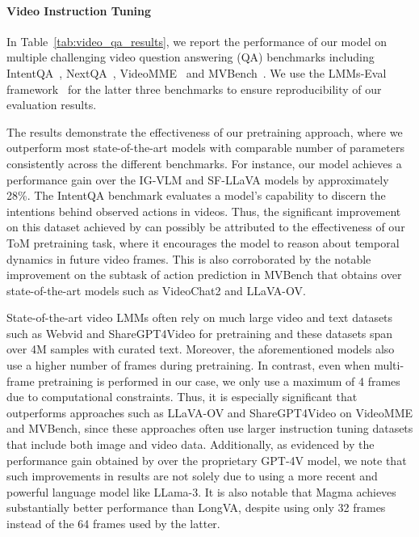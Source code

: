 \vspace{-0.3em}
\paragraph{Video Instruction Tuning} 
In Table~\ref{tab:video_qa_results}, we report the performance of our \magma model on multiple challenging video question answering (QA) benchmarks including IntentQA~\cite{Li2023IntentQACV}, NextQA~\cite{xiao2021next}, VideoMME~\cite{fu2024videommefirstevercomprehensiveevaluation} and MVBench~\cite{li2024mvbenchcomprehensivemultimodalvideo}. We use the LMMs-Eval framework~\cite{lmms_eval2024} for the latter three benchmarks to ensure reproducibility of our evaluation results. 

The results demonstrate the effectiveness of our pretraining approach, where we outperform most state-of-the-art models with comparable number of parameters consistently across the different benchmarks. For instance, our \magma model achieves a performance gain over the IG-VLM and SF-LLaVA models by approximately 28\%. The IntentQA benchmark evaluates a model's capability to discern the intentions behind observed actions in videos. Thus, the significant improvement on this dataset achieved by \magma can possibly be attributed to the effectiveness of our ToM pretraining task, where it encourages the model to reason about temporal dynamics in future video frames. This is also corroborated by the notable improvement on the subtask of action prediction in MVBench that \magma obtains over state-of-the-art models such as VideoChat2 and LLaVA-OV.

State-of-the-art video LMMs often rely on much large video and text datasets such as Webvid and ShareGPT4Video for pretraining and these datasets span over 4M samples with curated text. Moreover, the aforementioned models also use a higher number of frames during pretraining. In contrast, even when multi-frame pretraining is performed in our case, we only use a maximum of 4 frames due to computational constraints. Thus, it is especially significant that \magma outperforms approaches such as LLaVA-OV and ShareGPT4Video on VideoMME and MVBench, since these approaches often use larger instruction tuning datasets that include both image and video data. Additionally, as evidenced by the performance gain obtained by \magma over the proprietary GPT-4V model, we note that such improvements in results are not solely due to using a more recent and powerful language model like LLama-3. It is also notable that Magma achieves substantially better performance than LongVA, despite using only 32 frames instead of the 64 frames used by the latter. 